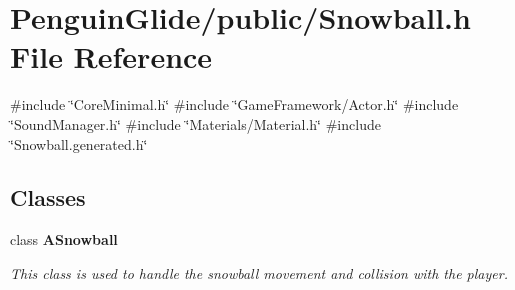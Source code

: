 \section{Penguin\+Glide/public/\+Snowball.h File Reference}
\label{_snowball_8h}
{\ttfamily \#include \char`\"{}Core\+Minimal.\+h\char`\"{}}\newline
{\ttfamily \#include \char`\"{}Game\+Framework/\+Actor.\+h\char`\"{}}\newline
{\ttfamily \#include \char`\"{}Sound\+Manager.\+h\char`\"{}}\newline
{\ttfamily \#include \char`\"{}Materials/\+Material.\+h\char`\"{}}\newline
{\ttfamily \#include \char`\"{}Snowball.\+generated.\+h\char`\"{}}\newline
\subsection*{Classes}
\begin{DoxyCompactItemize}
\item 
class \textbf{ A\+Snowball}
\begin{DoxyCompactList}\small\item\em This class is used to handle the snowball movement and collision with the player. \end{DoxyCompactList}\end{DoxyCompactItemize}
